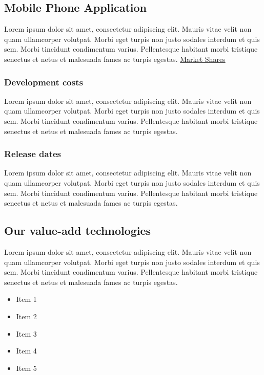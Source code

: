 \documentclass[11pt,a4paper,titlepage]{article}
\begin{document}
\subsection{Mobile Phone Application}
Lorem ipsum dolor sit amet, consectetur adipiscing elit. Mauris vitae velit 
non quam ullamcorper volutpat. Morbi eget turpis non justo sodales interdum 
et quis sem. Morbi tincidunt condimentum varius. Pellentesque habitant morbi 
tristique senectus et netus et malesuada fames ac turpis egestas.\newline
\hyperlink{market_share}{Market Shares}
 
\subsubsection{Development costs}
Lorem ipsum dolor sit amet, consectetur adipiscing elit. Mauris vitae velit 
non quam ullamcorper volutpat. Morbi eget turpis non justo sodales interdum 
et quis sem. Morbi tincidunt condimentum varius. Pellentesque habitant morbi 
tristique senectus et netus et malesuada fames ac turpis egestas.\newline

\subsubsection{Release dates}
Lorem ipsum dolor sit amet, consectetur adipiscing elit. Mauris vitae velit 
non quam ullamcorper volutpat. Morbi eget turpis non justo sodales interdum 
et quis sem. Morbi tincidunt condimentum varius. Pellentesque habitant morbi 
tristique senectus et netus et malesuada fames ac turpis egestas.\newline

\subsection{Our value-add technologies}
Lorem ipsum dolor sit amet, consectetur adipiscing elit. Mauris vitae velit 
non quam ullamcorper volutpat. Morbi eget turpis non justo sodales interdum 
et quis sem. Morbi tincidunt condimentum varius. Pellentesque habitant morbi 
tristique senectus et netus et malesuada fames ac turpis egestas.\newline
\begin{itemize}
\item Item 1
\item Item 2
\item Item 3
\item Item 4
\item Item 5
\end{itemize}
\end{document}
